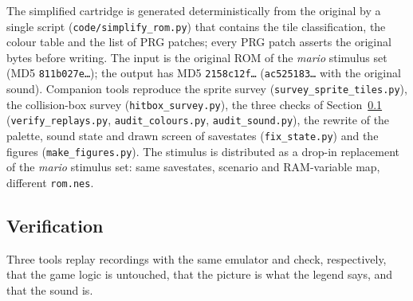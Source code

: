 \documentclass{article}
\begin{document}
The simplified cartridge is generated deterministically from the original by a single script
(\texttt{code/simplify\_rom.py}) that contains the tile classification, the colour table and the
list of PRG patches; every PRG patch asserts the original bytes before writing. The input is the
original ROM of the \textit{mario} stimulus set (MD5 \texttt{811b027e\ldots}); the output has MD5
\texttt{2158c12f\ldots} (\texttt{ac525183\ldots} with the original sound). Companion tools reproduce the sprite survey
(\texttt{survey\_sprite\_tiles.py}), the collision-box survey (\texttt{hitbox\_survey.py}), the
three checks of Section~\ref{sec:verification} (\texttt{verify\_replays.py},
\texttt{audit\_colours.py}, \texttt{audit\_sound.py}), the rewrite of the palette, sound state and
drawn screen of savestates (\texttt{fix\_state.py}) and the figures (\texttt{make\_figures.py}). The stimulus is distributed as a drop-in replacement of the
\textit{mario} stimulus set: same savestates, scenario and RAM-variable map, different
\texttt{rom.nes}.

\subsection{Verification}
\label{sec:verification}

Three tools replay recordings with the same emulator and check, respectively, that the game logic
is untouched, that the picture is what the legend says, and that the sound is.
\end{document}
